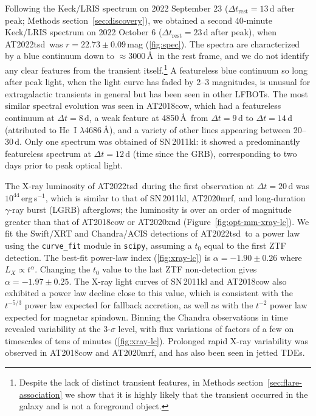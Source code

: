 \documentclass{nature_plusfigure}
\newcommand{\at}{AT2022tsd}
\begin{document}
\begin{methods}
Following the Keck/LRIS spectrum on 2022 September 23 ($\Delta t_\mathrm{rest}=13\,$d after peak; Methods section~\ref{sec:discovery}), we obtained a second 40-minute Keck/LRIS spectrum on 2022 October 6 ($\Delta t_\mathrm{rest}=23$\,d after peak), when \at\ was $r=22.73\pm0.09\,$mag (\ref{fig:spec}). 
The spectra are characterized by a blue continuum down to $\approx3000\,$\AA\ in the rest frame, and we do not identify any clear features from the transient itself.\footnote{Despite the lack of distinct transient features, in Methods section~\ref{sec:flare-association} we show that it is highly likely that the transient occurred in the galaxy and is not a foreground object.} A featureless blue continuum so long after peak light, when the light curve has faded by 2--3 magnitudes, is unusual for extragalactic transients in general\cite{GalYam2017hsn} but has been seen in other LFBOTs.
The most similar spectral evolution was seen in AT2018cow\cite{Perley2019}, which had a featureless continuum at $\Delta t=8$\,d, a weak feature at 4850\,\AA\ from $\Delta t=9$\,d to $\Delta t=14$\,d (attributed to He~I $\lambda$4686\,\AA), and a variety of other lines appearing between 20--30\,d.
Only one spectrum was obtained of SN\,2011kl: it showed a predominantly featureless spectrum at $\Delta t=12$\,d (time since the GRB), corresponding to two days prior to peak optical light.

The X-ray luminosity of \at\ during the first observation at $\Delta t=20$\,d was $10^{44}\,$erg\,s$^{-1}$, which is similar to that of SN\,2011kl\cite{Greiner2015}, AT2020mrf\cite{Yao2022}, and long-duration $\gamma$-ray burst (LGRB) afterglows; the luminosity is over an order of magnitude greater than that of AT2018cow\cite{RiveraSandoval2018,Margutti2019,Ho2019} or AT2020xnd\cite{Ho2022_AT2020xnd,Bright2022} (Figure~\ref{fig:opt-mm-xray-lc}).
We fit the Swift/XRT and Chandra/ACIS detections of \at\ to a power law using the \texttt{curve\_fit} module in \texttt{scipy}, assuming a $t_0$ equal to the first ZTF detection. The best-fit power-law index (\ref{fig:xray-lc}) is $\alpha=-1.90\pm0.26$ where $L_X \propto t^{\alpha}$.
Changing the $t_0$ value to the last ZTF non-detection gives $\alpha=-1.97\pm0.25$.
The X-ray light curves of SN\,2011kl and AT2018cow also exhibited a power law decline close to this value\cite{Margutti2019,Ho2019},
which is consistent with the $t^{-5/3}$ power law expected for fallback accretion\cite{Phinney1989}, as well as with the $t^{-2}$ power law expected for magnetar spindown.
Binning the Chandra observations in time revealed variability at the 3-$\sigma$ level, with flux variations of factors of a few on timescales of tens of minutes (\ref{fig:xray-lc}). Prolonged rapid X-ray variability was observed in AT2018cow\cite{RiveraSandoval2018,Margutti2019,Ho2019} and AT2020mrf\cite{Yao2022}, and has also been seen in jetted TDEs\cite{Levan2011,Burrows2011,Cenko2012}.


\end{methods}
\end{document}
